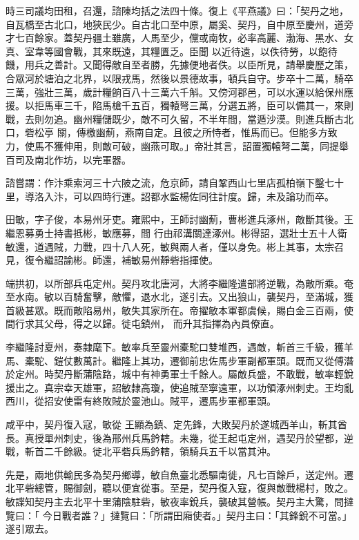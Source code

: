 \begin{pinyinscope}
 時三司議均田租，召還，諮陳均括之法四十條。復上《平燕議》曰：「契丹之地，自瓦橋至古北口，地狹民少。自古北口至中原，屬奚、契丹，自中原至慶州，道旁才七百餘家。蓋契丹疆土雖廣，人馬至少，儻或南牧，必率高麗、渤海、黑水、女真、室韋等國會戰，其來既遠，其糧匱乏。臣聞
 以近待遠，以佚待勞，以飽待饑，用兵之善計。又聞得敵自至者勝，先據便地者佚。以臣所見，請舉慶歷之策，合眾河於塘泊之北界，以限戎馬，然後以景德故事，頓兵自守。步卒十二萬，騎卒三萬，強壯三萬，歲計糧餉百八十三萬六千斛。又傍河郡邑，可以水運以給保州應援。以拒馬車三千，陷馬槍千五百，獨轅弩三萬，分選五將，臣可以備其一，來則戰，去則勿追。幽州糧儲既少，敵不可久留，不半年間，當遁沙漠。則進兵斷古北口，砦松亭
 關，傳檄幽薊，燕南自定。且彼之所恃者，惟馬而已。但能多方致力，使馬不獲伸用，則敵可破，幽燕可取。」帝壯其言，詔置獨轅弩二萬，同提舉百司及南北作坊，以完軍器。



 諮嘗謂：作汴乘索河三十六陂之流，危京師，請自鞏西山七里店孤柏嶺下鑿七十里，導洛入汴，可以四時行運。詔都水監楊佐同往計度。歸，未及論功而卒。



 田敏，字子俊，本易州牙吏。雍熙中，王師討幽薊，曹彬進兵涿州，敵斷其後。王繼恩募勇士持書抵彬，敏應募，間
 行由祁溝關達涿州。彬得詔，選壯士五十人衛敏還，道遇賊，力戰，四十八人死，敏與兩人者，僅以身免。彬上其事，太宗召見，復令繼詔諭彬。師還，補敏易州靜砦指揮使。



 端拱初，以所部兵屯定州。契丹攻北唐河，大將李繼隆遣部將逆戰，為敵所乘。奄至水南。敏以百騎奮擊，敵懼，退水北，遂引去。又出狼山，襲契丹，至滿城，獲首級甚眾。既而敵陷易州，敏失其家所在。帝擢敏本軍都虞候，賜白金三百兩，使間行求其父母，得之以歸。徙屯鎮州，
 而升其指揮為內員僚直。



 李繼隆討夏州，奏隸麾下。敏率兵至靈州橐駝口雙堆西，遇敵，斬首三千級，獲羊馬、橐駝、鎧仗數萬計。繼隆上其功，遷御前忠佐馬步軍副都軍頭。既而又從傅潛於定州。時契丹斷蒲陰路，城中有神勇軍士千餘人。屬敵兵盛，不敢戰，敏率輕銳援出之。真宗幸天雄軍，詔敏隸高瓊，使追賊至寧遠軍，以功領涿州刺史。王均亂西川，從招安使雷有終敗賊於靈池山。賊平，遷馬步軍都軍頭。



 咸平中，契丹復入寇，敏從
 王顯為鎮、定先鋒，大敗契丹於遂城西羊山，斬其酋長。真授單州刺史，後為邢州兵馬鈐轄。未幾，從王起屯定州，遇契丹於望都，逆戰，斬首二千餘級。徙北平砦兵馬鈐轄，領騎兵五千以當其沖。



 先是，兩地供輸民多為契丹鄉導，敏自魚臺北悉驅南徙，凡七百餘戶，送定州。遷北平砦總管，賜御劍，聽以便宜從事。至是，契丹復入寇，復與敵戰楊村，敗之。敏諜知契丹主去北平十里蒲陰駐砦，敏夜率銳兵，襲破其營帳。契丹主大驚，問撻覽曰：「
 今日戰者誰？」撻覽曰：「所謂田廂使者。」契丹主曰：「其鋒銳不可當。」遂引眾去。




\end{pinyinscope}
